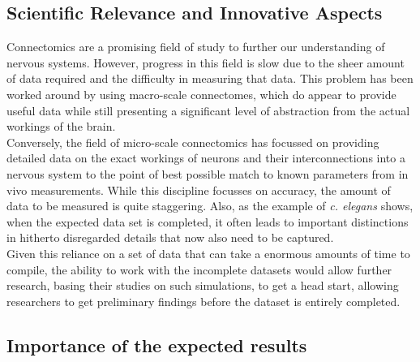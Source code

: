 \documentclass[a4paper,11pt]{article}
\begin{document}
\subsection{Scientific Relevance and Innovative Aspects}
Connectomics are a promising field of study to further our understanding of nervous systems. However, progress in this field is slow due to the sheer amount of data required and the difficulty in measuring that data. This problem has been worked around by using macro-scale connectomes, which do appear to provide useful data while still presenting a significant level of abstraction from the actual workings of the brain. 
\\[0,2cm]
Conversely, the field of micro-scale connectomics has focussed on providing detailed data on the exact workings of neurons and their interconnections into a nervous system to the point of best possible match to known parameters from in vivo measurements. While this discipline focusses on accuracy, the amount of data to be measured is quite staggering. Also, as the example of \emph{c. elegans} shows, when the expected data set is completed, it often leads to important distinctions in hitherto disregarded details that now also need to be captured. \\[0,2cm]
Given this reliance on a set of data that can take a enormous amounts of time to compile, the ability to work with the incomplete datasets would allow further research, basing their studies on such simulations, to get a head start, allowing researchers to get preliminary findings before the dataset is entirely completed.

\subsection{Importance of the expected results}
\end{document}
